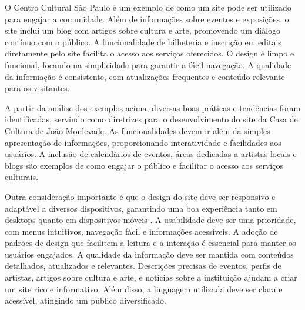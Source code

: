 O Centro Cultural São Paulo é um exemplo de como um site pode ser utilizado para engajar a comunidade. Além de informações sobre eventos e exposições, o site inclui um blog com artigos sobre cultura e arte, promovendo um diálogo contínuo com o público. A funcionalidade de bilheteria e inscrição em editais diretamente pelo site facilita o acesso aos serviços oferecidos. O design é limpo e funcional, focando na simplicidade para garantir a fácil navegação. A qualidade da informação é consistente, com atualizações frequentes e conteúdo relevante para os visitantes.

A partir da análise dos exemplos acima, diversas boas práticas e tendências foram identificadas, servindo como diretrizes para o desenvolvimento do site da Casa de Cultura de João Monlevade. As funcionalidades devem ir além da simples apresentação de informações, proporcionando interatividade e facilidades aos usuários. A inclusão de calendários de eventos, áreas dedicadas a artistas locais e blogs são exemplos de como engajar o público e facilitar o acesso aos serviços culturais.

Outra consideração importante é que o design do site deve ser responsivo e adaptável a diversos dispositivos, garantindo uma boa experiência tanto em desktops quanto em dispositivos móveis \cite{almeida2017role}. A usabilidade deve ser uma prioridade, com menus intuitivos, navegação fácil e informações acessíveis. A adoção de padrões de design que facilitem a leitura e a interação é essencial para manter os usuários engajados. A qualidade da informação deve ser mantida com conteúdos detalhados, atualizados e relevantes. Descrições precisas de eventos, perfis de artistas, artigos sobre cultura e arte, e notícias sobre a instituição ajudam a criar um site rico e informativo. Além disso, a linguagem utilizada deve ser clara e acessível, atingindo um público diversificado.
